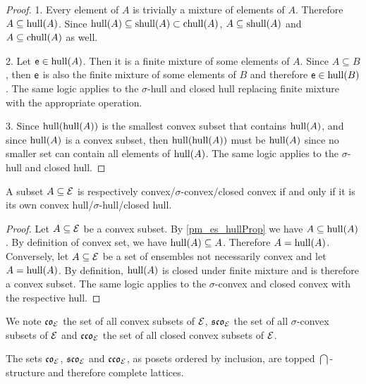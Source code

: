 \begin{mathSection}
\begin{proof}
	1. Every element of $A$ is trivially a mixture of elements of $A$. Therefore $A \subseteq \mathrm{hull}(A)$. Since $\mathrm{hull}(A) \subseteq \mathrm{shull}(A) \subset \mathrm{chull}(A)$, $A \subseteq \mathrm{shull}(A)$ and $A \subseteq \mathrm{chull}(A)$ as well. 
	
	2. Let $\mathsf{e} \in \mathrm{hull}(A)$. Then it is a finite mixture of some elements of $A$. Since $A \subseteq B$, then $\mathsf{e}$ is also the finite mixture of some elements of $B$ and therefore $\mathsf{e} \in \mathrm{hull}(B)$. The same logic applies to the $\sigma$-hull and closed hull replacing finite mixture with the appropriate operation.
	
	3. Since $\mathrm{hull}(\mathrm{hull}(A))$ is the smallest convex subset that contains $\mathrm{hull}(A)$, and since $\mathrm{hull}(A)$ is a convex subset, then $\mathrm{hull}(\mathrm{hull}(A))$ must be $\mathrm{hull}(A)$ since no smaller set can contain all elements of $\mathrm{hull}(A)$. The same logic applies to the $\sigma$-hull and closed hull.
\end{proof}

\begin{coro}
	A subset $A \subseteq \mathcal{E}$ is respectively convex/$\sigma$-convex/closed convex if and only if it is its own convex hull/$\sigma$-hull/closed hull.
\end{coro}

\begin{proof}
	Let $A \subseteq \mathcal{E}$ be a convex subset. By \ref{pm_es_hullProp} we have $A \subseteq \mathrm{hull}(A)$. By definition of convex set, we have $\mathrm{hull}(A) \subseteq A$. Therefore $A = \mathrm{hull}(A)$. Conversely, let $A \subseteq \mathcal{E}$ be a set of ensembles not necessarily convex and let $A=\mathrm{hull}(A)$. By definition, $\mathrm{hull}(A)$ is closed under finite mixture and is therefore a convex subset. The same logic applies to the $\sigma$-convex and closed convex with the respective hull.
\end{proof}

\begin{defn}
	We note $\mathfrak{co}_{\mathcal{E}}$ the set of all convex subsets of $\mathcal{E}$, $\mathfrak{sco}_{\mathcal{E}}$ the set of all $\sigma$-convex subsets of $\mathcal{E}$ and $\mathfrak{cco}_{\mathcal{E}}$ the set of all closed convex subsets of $\mathcal{E}$.
\end{defn}

\begin{prop}
	The sets $\mathfrak{co}_{\mathcal{E}}$, $\mathfrak{sco}_{\mathcal{E}}$ and $\mathfrak{cco}_{\mathcal{E}}$, as posets ordered by inclusion, are topped $\bigcap$-structure and therefore complete lattices.
\end{prop}


\end{mathSection}
